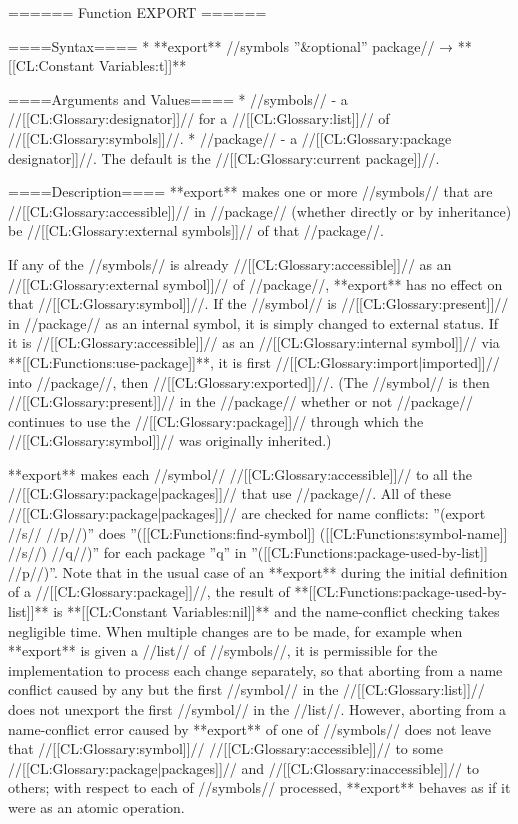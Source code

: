 ====== Function EXPORT ======

====Syntax====
  * **export** //symbols ''&optional'' package// → **[[CL:Constant Variables:t]]**

====Arguments and Values====
  * //symbols// - a //[[CL:Glossary:designator]]// for a //[[CL:Glossary:list]]// of //[[CL:Glossary:symbols]]//.
  * //package// - a //[[CL:Glossary:package designator]]//. The default is the //[[CL:Glossary:current package]]//.

====Description====
**export** makes one or more //symbols// that are //[[CL:Glossary:accessible]]// in //package// (whether directly or by inheritance) be //[[CL:Glossary:external symbols]]// of that //package//.

If any of the //symbols// is already //[[CL:Glossary:accessible]]// as an //[[CL:Glossary:external symbol]]// of //package//, **export** has no effect on that //[[CL:Glossary:symbol]]//. If the //symbol// is //[[CL:Glossary:present]]// in //package// as an internal symbol, it is simply changed to external status. If it is //[[CL:Glossary:accessible]]// as an //[[CL:Glossary:internal symbol]]// via **[[CL:Functions:use-package]]**, it is first //[[CL:Glossary:import|imported]]// into //package//, then //[[CL:Glossary:exported]]//. (The //symbol// is then //[[CL:Glossary:present]]// in the //package// whether or not //package// continues to use the //[[CL:Glossary:package]]// through which the //[[CL:Glossary:symbol]]// was originally inherited.)

**export** makes each //symbol// //[[CL:Glossary:accessible]]// to all the //[[CL:Glossary:package|packages]]// that use //package//. All of these //[[CL:Glossary:package|packages]]// are checked for name conflicts: ''(export //s// //p//)'' does ''([[CL:Functions:find-symbol]] ([[CL:Functions:symbol-name]] //s//) //q//)'' for each package ''q'' in ''([[CL:Functions:package-used-by-list]] //p//)''. Note that in the usual case of an **export** during the initial definition of a //[[CL:Glossary:package]]//, the result of **[[CL:Functions:package-used-by-list]]** is **[[CL:Constant Variables:nil]]** and the name-conflict checking takes negligible time. When multiple changes are to be made, for example when **export** is given a //list// of //symbols//, it is permissible for the implementation to process each change separately, so that aborting from a name conflict caused by any but the first //symbol// in the //[[CL:Glossary:list]]// does not unexport the first //symbol// in the //list//. However, aborting from a name-conflict error caused by **export** of one of //symbols// does not leave that //[[CL:Glossary:symbol]]// //[[CL:Glossary:accessible]]// to some //[[CL:Glossary:package|packages]]// and //[[CL:Glossary:inaccessible]]// to others; with respect to each of //symbols// processed, **export** behaves as if it were as an atomic operation.


